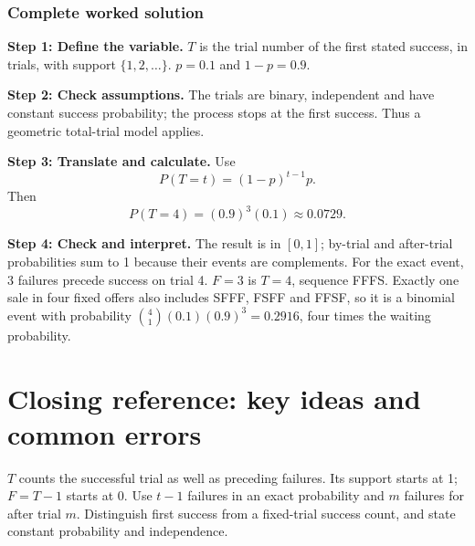 \subsubsection*{Complete worked solution}
\par\noindent\begin{minipage}{\linewidth}
\textbf{Step 1: Define the variable.} $T$ is the trial number of the first stated success, in trials, with support $\{1,2,\ldots\}$. $p=0.1$ and $1-p=0.9$.
\end{minipage}\par\medskip
\par\noindent\begin{minipage}{\linewidth}
\textbf{Step 2: Check assumptions.} The trials are binary, independent and have constant success probability; the process stops at the first success. Thus a geometric total-trial model applies.
\end{minipage}\par\medskip
\par\noindent\begin{minipage}{\linewidth}
\textbf{Step 3: Translate and calculate.} Use
\[P(T=t)=(1-p)^{t-1}p.\]
Then
\[P(T=4)=(0.9)^{3}(0.1)\approx 0.0729.\]
\end{minipage}\par\medskip
\par\noindent\begin{minipage}{\linewidth}
\textbf{Step 4: Check and interpret.} The result is in $[0,1]$; by-trial and after-trial probabilities sum to 1 because their events are complements. For the exact event, 3 failures precede success on trial 4. $F=3$ is $T=4$, sequence FFFS. Exactly one sale in four fixed offers also includes SFFF, FSFF and FFSF, so it is a binomial event with probability $\binom41(0.1)(0.9)^3=0.2916$, four times the waiting probability.
\end{minipage}\par\medskip
{}
\section{Closing reference: key ideas and common errors}
$T$ counts the successful trial as well as preceding failures. Its support starts at 1; $F=T-1$ starts at 0. Use $t-1$ failures in an exact probability and $m$ failures for after trial $m$. Distinguish first success from a fixed-trial success count, and state constant probability and independence.
\secInicio

